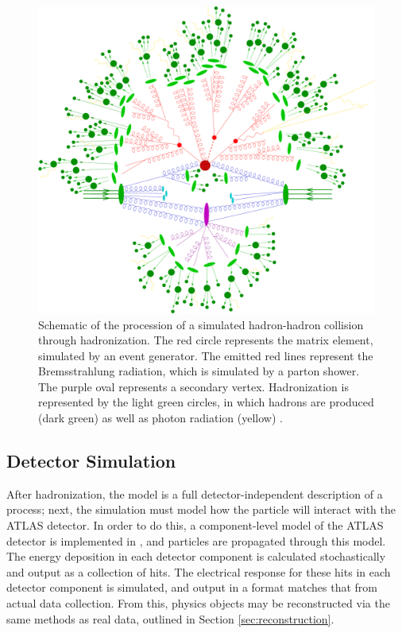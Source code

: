 \begin{figure}[!thp]
    \centering
    \includegraphics[width=1\textwidth]{chapters/chapter3_eventreco/images/parton-shower.png}

    \caption[Schematic of the procession of a simulated hadron-hadron collision.]{Schematic of the procession of a simulated hadron-hadron collision through hadronization. The red circle represents the matrix element, simulated by an event generator. The emitted red lines represent the Bremsstrahlung radiation, which is simulated by a parton shower. The purple oval represents a secondary vertex. Hadronization is represented by the light green circles, in which hadrons are produced (dark green) as well as photon radiation (yellow) \cite{parton-shower-sketch}.}
    \label{fig:parton-shower-sketch}
\end{figure}


\subsection{Detector Simulation}  \label{ssec:simulation} 
After hadronization, the model is a full detector-independent description of a process; next, the simulation must model how the particle will interact with the ATLAS detector. In order to do this, a component-level model of the ATLAS detector is implemented in \GEANTFOUR \cite{geant4}, and particles are propagated through this model. The energy deposition in each detector component is calculated stochastically and output as a collection of hits. The electrical response for these hits in each detector component is simulated, and output in a format matches that from actual data collection. From this, physics objects may be reconstructed via the same methods as real data, outlined in Section \ref{sec:reconstruction}.

